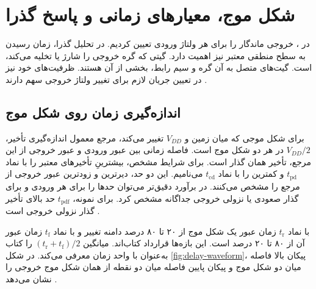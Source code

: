 \section{شکل موج، معیارهای زمانی و پاسخ گذرا}
\label{sec:delay-transient}

در ، خروجی ماندگار
را برای هر ولتاژ ورودی تعیین کردیم. در تحلیل گذرا، زمان رسیدن به سطح
منطقی معتبر نیز اهمیت دارد. گیتی که گره خروجی را شارژ یا تخلیه می‌کند،
 است. گیت‌های متصل به آن گره و سیم رابط، بخشی از 
آن هستند. ظرفیت‌های خود  نیز در تعیین جریان لازم برای تغییر
ولتاژ خروجی سهم دارند \cite[بخش‌های  و
، صفحات ۱۴۱ تا ۱۴۴]{weste}.

\subsection{اندازه‌گیری زمان روی شکل موج}
\label{sec:delay-waveform}

برای شکل موجی که میان زمین و \(V_{DD}\) تغییر می‌کند، مرجع معمول
اندازه‌گیری تأخیر، \(V_{DD}/2\) در هر دو شکل موج است. فاصله زمانی
بین عبور ورودی و عبور خروجی از این مرجع، تأخیر همان گذار است.
برای شرایط مشخص، بیشترینِ تأخیرهای معتبر را 
با نماد \(t_{\mathrm{pd}}\) و کمترین را 
با نماد \(t_{\mathrm{cd}}\) می‌نامیم. این دو حد، دیرترین و زودترین
عبور خروجی از مرجع را مشخص می‌کنند. در برآورد دقیق‌تر می‌توان حدها
را برای هر ورودی و برای گذار صعودی یا نزولی خروجی جداگانه مشخص کرد.
برای نمونه، \(t_{\mathrm{pdf}}\) حد بالای تأخیر گذار نزولی خروجی است
\cite[بخش  و شکل ، صفحات ۱۴۱ و ۱۴۲]{weste}.

 با نماد \(t_{\mathrm{r}}\) زمان عبور یک شکل موج از
۲۰ تا ۸۰ درصد دامنه تغییر و  با نماد \(t_{\mathrm{f}}\)
زمان عبور آن از ۸۰ تا ۲۰ درصد است. این بازه‌ها قرارداد کتاب‌اند.
میانگین \((t_{\mathrm{r}}+t_{\mathrm{f}})/2\) را کتاب به‌عنوان
 با واحد زمان معرفی می‌کند. در شکل
\ref{fig:delay-waveform}، پیکان بالا فاصله میان دو شکل موج و پیکان
پایین فاصله میان دو نقطه از همان شکل موج خروجی را نشان می‌دهد
\cite[بخش ، صفحه ۱۴۱]{weste}.

